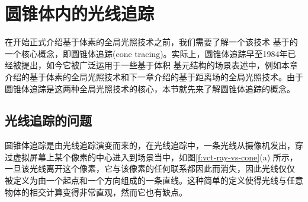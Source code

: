 \section{圆锥体内的光线追踪}\label{sec:vct-ray-tracing-in-a-cone}
在开始正式介绍基于体素的全局光照技术之前，我们需要了解一个该技术 基于的一个核心概念，即圆锥体追踪(cone tracing)。实际上，圆锥体追踪早至1984年已经被提出\cite{a:RayTracingwithCones}，如今它被广泛运用于一些基于体积 基元结构的场景表述中，例如本章介绍的基于体素的全局光照技术和下一章介绍的基于距离场的全局光照技术。由于圆锥体追踪是这两种全局光照技术的核心，本节就先来了解圆锥体追踪的概念。




\subsection{光线追踪的问题}
圆锥体追踪是由光线追踪演变而来的，在光线追踪中，一条光线从摄像机发出，穿过虚拟屏幕上某个像素的中心进入到场景当中，如图\ref{f:vct-ray-vs-cone}(a) 所示，一旦该光线离开这个像素，它与该像素的任何联系都因此而消失，因此光线仅仅 被定义为由一个起点和一个方向组成的一条直线。这种简单的定义使得光线与任意物体的相交计算变得非常直观，然而它也有缺点。

